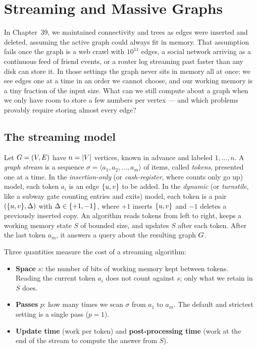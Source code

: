 \chapter{Streaming and Massive Graphs}
\label{ch:streaming}

In Chapter~39, we maintained connectivity and trees as edges were inserted
and deleted, assuming the active graph could always fit in memory.
That assumption fails once the graph is a web crawl with $10^{11}$ edges,
a social network arriving as a continuous feed of friend events, or a router log
streaming past faster than any disk can store it. In those settings the graph never
sits in memory all at once: we see edges one at a time in an order we cannot
choose, and our working memory is a tiny fraction of the input size.
What can we still compute about a graph when we only have room to store a few
numbers per vertex --- and which problems provably require storing almost every edge?

\chapterline

\section{The streaming model}
\label{ch40:model}

\begin{definition}\label{ch40:def-stream}
Let $G=(V,E)$ have $n=\lvert V\rvert$ vertices, known in advance and labeled
$1,\dots,n$. A \emph{graph stream} is a sequence
$\sigma = \langle a_1, a_2, \dots, a_m\rangle$ of items, called \emph{tokens},
presented one at a time. In the \emph{insertion-only} (or \emph{cash-register},
where counts only go up) model, each token $a_i$ is an edge $\{u,v\}$ to be
added. In the \emph{dynamic} (or \emph{turnstile}, like a subway gate counting
entries and exits) model, each token is a pair $(\{u,v\}, \Delta)$ with
$\Delta \in \{+1,-1\}$, where $+1$ inserts $\{u,v\}$ and $-1$ deletes a
previously inserted copy. An algorithm reads tokens from left to right, keeps a
working memory state $S$ of bounded size, and updates $S$ after each token.
After the last token $a_m$, it answers a query about the resulting graph $G$.
\end{definition}

Three quantities measure the cost of a streaming algorithm:

\begin{itemize}
\item \textbf{Space} $s$: the number of bits of working memory kept between
tokens. Reading the current token $a_i$ does not count against $s$; only what
we retain in $S$ does.
\item \textbf{Passes} $p$: how many times we scan $\sigma$ from $a_1$ to $a_m$.
The default and strictest setting is a single pass ($p=1$).
\item \textbf{Update time} (work per token) and \textbf{post-processing time}
(work at the end of the stream to compute the answer from $S$).
\end{itemize}

